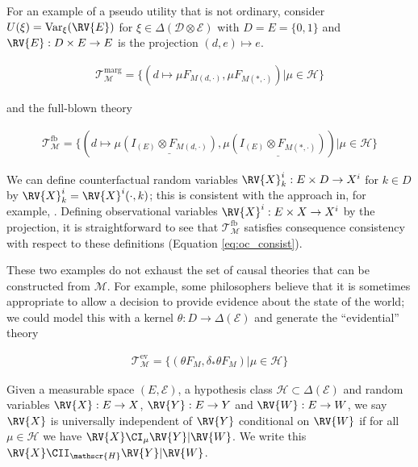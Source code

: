 For an example of a pseudo utility that is not ordinary, consider $U(\xi) = \text{Var}_{\xi}(\RV{E})$ for $\xi\in\Delta(\mathcal{D}\otimes\mathcal{E})$ with $D=E=\{0,1\}$ and $\RV{E}:D\times E\to E$ is the projection $(d,e)\mapsto e$.


\begin{example}
\begin{align}
    \mathscr{T}_{\mathscr{M}}^{\mathrm{marg}} = \{(d\mapsto \mu F_{M(d,\cdot)},\mu F_{M(*,\cdot)})|\mu\in \mathscr{H}\} 
\end{align}

and the full-blown theory

\begin{align}
        \mathscr{T}_{\mathscr{M}}^{\mathrm{fb}} = \{(d\mapsto \mu \underline{(I_{(E)}\otimes F_{M(d,\cdot)})},\mu \underline{(I_{(E)}\otimes F_{M(*,\cdot)})})|\mu\in \mathscr{H}\}
\end{align}

We can define counterfactual random variables $\RV{X}^i_k:E\times D\to X^i$ for $k\in D$ by $\RV{X}^i_k=\RV{X}^i(\cdot,k)$; this is consistent with the approach in, for example, \cite{balke_counterfactual_1994}. Defining observational variables $\RV{X}^i:E\times X\to X^i$ by the projection, it is straightforward to see that $\mathscr{T}^{\mathrm{fb}}_{\mathscr{M}}$ satisfies consequence consistency with respect to these definitions (Equation \ref{eq:oc_consist}).



These two examples do not exhaust the set of causal theories that can be constructed from $\mathscr{M}$. For example, some philosophers believe that it is sometimes appropriate to allow a decision to provide evidence about the state of the world; we could model this with a kernel $\theta:D\to \Delta(\mathcal{E})$ and generate the ``evidential'' theory

\begin{align}
        \mathscr{T}_{\mathscr{M}}^{\mathrm{ev}} = \{(\theta  F_{M},\delta_{*}\theta F_{M})|\mu\in \mathscr{H}\}
\end{align}

\end{example}



\begin{definition}\label{def:univ_indep}
Given a measurable space $(E,\mathcal{E})$, a hypothesis class $\mathscr{H}\subset\Delta(\mathcal{E})$ and random variables $\RV{X}:E\to X$, $\RV{Y}:E\to Y$ and $\RV{W}:E\to W$, we say $\RV{X}$ is universally independent of $\RV{Y}$ conditional on $\RV{W}$ if for all $\mu\in\mathscr{H}$ we have $\RV{X}\CI_\mu \RV{Y} | \RV{W}$. We write this $\RV{X} \CII_\mathscr{H} \RV{Y} | \RV{W}$.
\end{definition}


